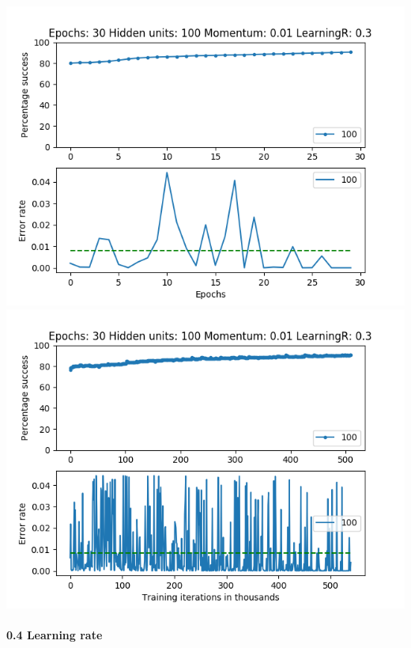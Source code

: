 \documentclass[11pt]{article}
\makeatletter
\def\maxwidth{\ifdim\Gin@nat@width>\linewidth\linewidth
    \else\Gin@nat@width\fi}
\let\Oldincludegraphics\includegraphics
\renewcommand{\includegraphics}[1]{\Oldincludegraphics[width=.8\maxwidth]{#1}}
\makeatother
\begin{document}
\includegraphics{Experiment2/E2_NN_Epoch_Momentum_0.01_30Epochs_100_LR_0.3_Hiddenunits.png}
\includegraphics{Experiment2/E2_NN_Training_Momentum_0.01_30Epochs_100_LR_0.3_Hiddenunits.png}

\hypertarget{learning-rate-4}{%
\paragraph{0.4 Learning rate}\label{learning-rate-4}}
\end{document}
